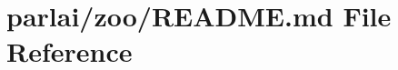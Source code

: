 \hypertarget{parlai_2zoo_2README_8md}{}\section{parlai/zoo/\+R\+E\+A\+D\+ME.md File Reference}
\label{parlai_2zoo_2README_8md}
